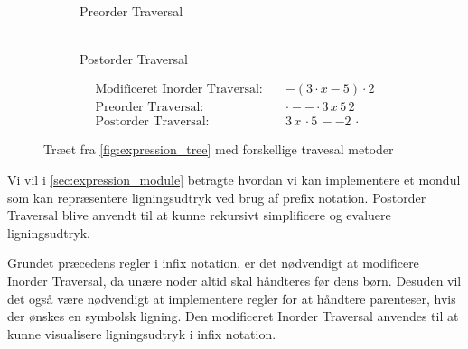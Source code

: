 \documentclass{article}
\begin{document}
\begin{figure}[H]
\begin{subfigure}{0.3\textwidth}
    \caption{\\Preorder Traversal}
  \end{subfigure}
  \hfill
  \begin{subfigure}{0.3\textwidth}
    \centering
    \caption{\\Postorder Traversal}
  \end{subfigure}
  \begin{align*}
      \text{Modificeret Inorder Traversal:} \quad & - (3 \cdot x - 5) \cdot 2 \\
      \text{Preorder Traversal:} \quad &  \cdot - - \cdot 3\, x\, 5\, 2  \\
      \text{Postorder Traversal:} \quad & 3\, x\, \cdot 5\, - -  2\, \cdot
  \end{align*}
  \caption{Træet fra \ref{fig:expression_tree} med forskellige travesal metoder}
  \label{fig:expression_tree_traversal}
\end{figure}


Vi vil i \ref{sec:expression_module} betragte hvordan vi kan implementere et mondul som kan repræsentere ligningsudtryk ved brug af prefix notation.
Postorder Traversal blive anvendt til at kunne rekursivt simplificere og evaluere ligningsudtryk.

Grundet præcedens regler i infix notation, er det nødvendigt at modificere Inorder Traversal, da unære noder altid skal håndteres før dens børn. Desuden vil det også være nødvendigt at implementere regler for at håndtere parenteser, hvis der ønskes en symbolsk ligning. Den modificeret Inorder Traversal anvendes til at kunne visualisere ligningsudtryk i infix notation.
\end{document}
